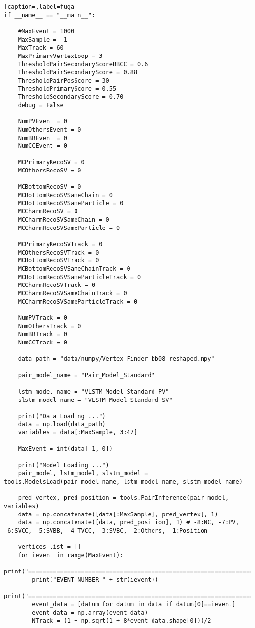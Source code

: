 \begin{lstlisting}[caption=,label=fuga]
if __name__ == "__main__":

    #MaxEvent = 1000
    MaxSample = -1
    MaxTrack = 60
    MaxPrimaryVertexLoop = 3
    ThresholdPairSecondaryScoreBBCC = 0.6
    ThresholdPairSecondaryScore = 0.88
    ThresholdPairPosScore = 30
    ThresholdPrimaryScore = 0.55
    ThresholdSecondaryScore = 0.70
    debug = False

    NumPVEvent = 0
    NumOthersEvent = 0
    NumBBEvent = 0
    NumCCEvent = 0

    MCPrimaryRecoSV = 0
    MCOthersRecoSV = 0

    MCBottomRecoSV = 0
    MCBottomRecoSVSameChain = 0
    MCBottomRecoSVSameParticle = 0
    MCCharmRecoSV = 0
    MCCharmRecoSVSameChain = 0
    MCCharmRecoSVSameParticle = 0

    MCPrimaryRecoSVTrack = 0
    MCOthersRecoSVTrack = 0
    MCBottomRecoSVTrack = 0
    MCBottomRecoSVSameChainTrack = 0
    MCBottomRecoSVSameParticleTrack = 0
    MCCharmRecoSVTrack = 0
    MCCharmRecoSVSameChainTrack = 0
    MCCharmRecoSVSameParticleTrack = 0
    
    NumPVTrack = 0
    NumOthersTrack = 0 
    NumBBTrack = 0
    NumCCTrack = 0

    data_path = "data/numpy/Vertex_Finder_bb08_reshaped.npy"

    pair_model_name = "Pair_Model_Standard"

    lstm_model_name = "VLSTM_Model_Standard_PV"
    slstm_model_name = "VLSTM_Model_Standard_SV"

    print("Data Loading ...")
    data = np.load(data_path)
    variables = data[:MaxSample, 3:47]
    
    MaxEvent = int(data[-1, 0])

    print("Model Loading ...")
    pair_model, lstm_model, slstm_model = tools.ModelsLoad(pair_model_name, lstm_model_name, slstm_model_name)

    pred_vertex, pred_position = tools.PairInference(pair_model, variables)
    data = np.concatenate([data[:MaxSample], pred_vertex], 1)
    data = np.concatenate([data, pred_position], 1) # -8:NC, -7:PV, -6:SVCC, -5:SVBB, -4:TVCC, -3:SVBC, -2:Others, -1:Position

    vertices_list = []
    for ievent in range(MaxEvent):
        print("=================================================================================================")
        print("EVENT NUMBER " + str(ievent))
        print("=================================================================================================")
        event_data = [datum for datum in data if datum[0]==ievent]
        event_data = np.array(event_data)
        NTrack = (1 + np.sqrt(1 + 8*event_data.shape[0]))/2 
        

\end{lstlisting}
